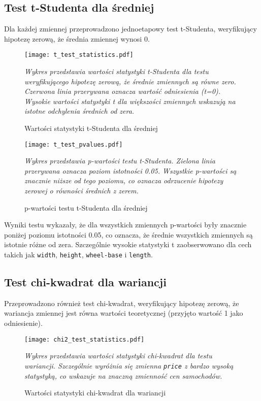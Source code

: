 \documentclass[12pt,a4paper]{article}
\begin{document}
\subsection{Test t-Studenta dla średniej}

Dla każdej zmiennej przeprowadzono jednoetapowy test t-Studenta, weryfikujący hipotezę zerową, że średnia zmiennej wynosi 0.

\begin{figure}[H]
    \centering
    \texttt{[image: t\_test\_statistics.pdf]}
    \caption{Wartości statystyki t-Studenta dla średniej}
    \label{fig:t_test_stat}
    \small\textit{Wykres przedstawia wartości statystyki t-Studenta dla testu weryfikującego hipotezę zerową, że średnie zmiennych są równe zero. Czerwona linia przerywana oznacza wartość odniesienia (t=0). Wysokie wartości statystyki t dla większości zmiennych wskazują na istotne odchylenia średnich od zera.}
\end{figure}

\begin{figure}[H]
    \centering
    \texttt{[image: t\_test\_pvalues.pdf]}
    \caption{p-wartości testu t-Studenta dla średniej}
    \label{fig:t_test_pval}
    \small\textit{Wykres przedstawia p-wartości testu t-Studenta. Zielona linia przerywana oznacza poziom istotności 0.05. Wszystkie p-wartości są znacznie niższe od tego poziomu, co oznacza odrzucenie hipotezy zerowej o równości średnich z zerem.}
\end{figure}

Wyniki testu wykazały, że dla wszystkich zmiennych p-wartości były znacznie poniżej poziomu istotności 0.05, co oznacza, że średnie wszystkich zmiennych są istotnie różne od zera. Szczególnie wysokie statystyki t zaobserwowano dla cech takich jak \texttt{width}, \texttt{height}, \texttt{wheel-base} i \texttt{length}.

\subsection{Test chi-kwadrat dla wariancji}

Przeprowadzono również test chi-kwadrat, weryfikujący hipotezę zerową, że wariancja zmiennej jest równa wartości teoretycznej (przyjęto wartość 1 jako odniesienie).

\begin{figure}[H]
    \centering
    \texttt{[image: chi2\_test\_statistics.pdf]}
    \caption{Wartości statystyki chi-kwadrat dla wariancji}
    \label{fig:chi2_test_stat}
    \small\textit{Wykres przedstawia wartości statystyki chi-kwadrat dla testu wariancji. Szczególnie wyróżnia się zmienna \texttt{price} z bardzo wysoką statystyką, co wskazuje na znaczną zmienność cen samochodów.}
\end{figure}
\end{document}
